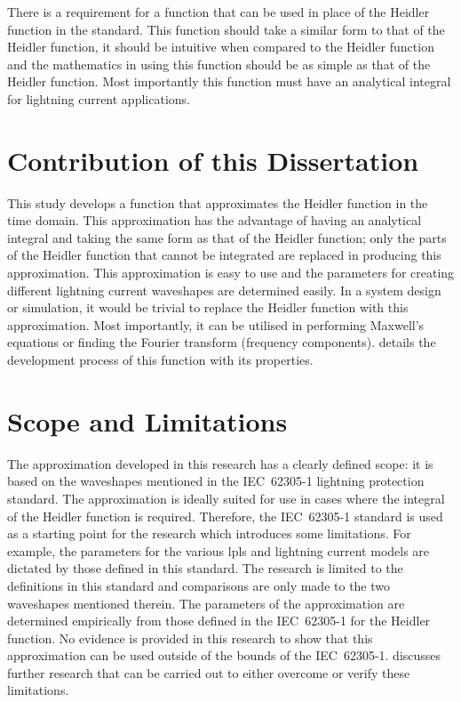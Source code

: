 There is a requirement for a function that can be used in place of the Heidler function in the standard. This function should take a similar form to that of the Heidler function, it should be intuitive when compared to the Heidler function and the mathematics in using this function should be as simple as that of the Heidler function. Most importantly this function must have an analytical integral for lightning current applications.


\section{Contribution of this Dissertation}
\label{sec:approach_contribution_of_this_dissertation}
This study develops a function that approximates the Heidler function in the time domain. This approximation has the advantage of having an analytical integral and taking the same form as that of the Heidler function; only the parts of the Heidler function that cannot be integrated are replaced in producing this approximation. This approximation is easy to use and the parameters for creating different lightning current waveshapes are determined easily. In a system design or simulation, it would be trivial to replace the Heidler function with this approximation. Most importantly, it can be utilised in performing Maxwell's equations or finding the Fourier transform (frequency components).  details the development process of this function with its properties.



\section{Scope and Limitations}
\label{sec:approach_scope_and_limitations}
The approximation developed in this research has a clearly defined scope: it is based on the waveshapes mentioned in the IEC~62305-1 lightning protection standard. The approximation is ideally suited for use in cases where the integral of the Heidler function is required. Therefore, the IEC~62305-1 standard is used as a starting point for the research which introduces some limitations. For example, the parameters for the various \glspl{lpl} and lightning current models are dictated by those defined in this standard. The research is limited to the definitions in this standard and comparisons are only made to the two waveshapes mentioned therein. The parameters of the approximation are determined empirically from those defined in the IEC~62305-1 for the Heidler function. No evidence is provided in this research to show that this approximation can be used outside of the bounds of the IEC~62305-1.  discusses further research that can be carried out to either overcome or verify these limitations.


